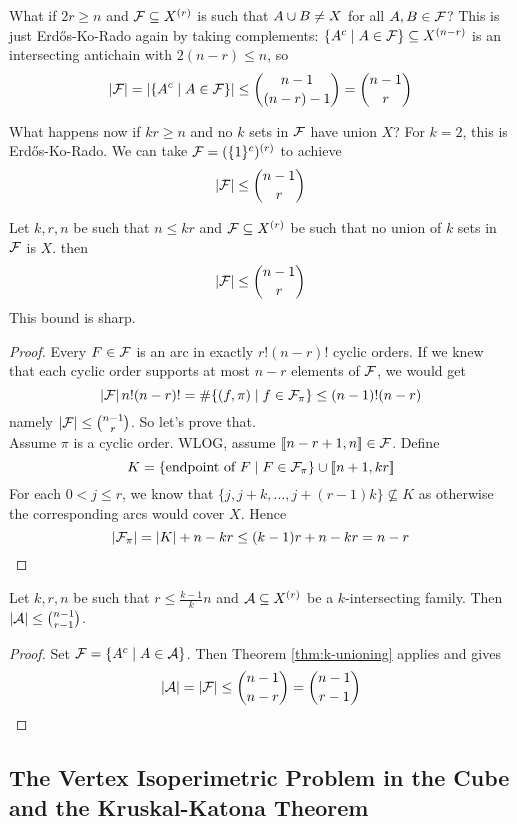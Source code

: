 \documentclass{article}
\begin{document}
\newlec

What if $2r \ge n$ and $\mathcal F \subseteq X^{(r)}$ is such that $A \cup B \ne X$ for all $A, B \in \mathcal F$? This is just Erd\H os-Ko-Rado again by taking complements: $\{A^c \mid A \in \mathcal F\} \subseteq X^{(n - r)}$ is an intersecting antichain with $2(n - r) \le n$, so
$$\left\lvert \mathcal F\right\rvert = \left\lvert \{A^c \mid A \in \mathcal F\}\right\rvert \le \binom{n - 1}{(n - r) - 1} = \binom{n - 1}r$$

What happens now if $kr \ge n$ and no $k$ sets in $\mathcal F$ have union $X$? For $k = 2$, this is Erd\H os-Ko-Rado. We can take $\mathcal F = (\{1\}^c)^{(r)}$ to achieve
$$\left\lvert \mathcal F\right\rvert \le \binom{n - 1}r$$

\begin{nthm}[Frankl]\label{thm:k-unioning}
  Let $k, r, n$ be such that $n \le kr$ and $\mathcal F \subseteq X^{(r)}$ be such that no union of $k$ sets in $\mathcal F$ is $X$. then
  $$\left\lvert \mathcal F\right\rvert \le \binom{n - 1}r$$
  This bound is sharp.
\end{nthm}
\begin{proof}
  Every $F \in \mathcal F$ is an arc in exactly $r!(n - r)!$ cyclic orders. If we knew that each cyclic order supports at most $n - r$ elements of $\mathcal F$, we would get
  $$\left\lvert \mathcal F\right\rvert n!(n - r)! = \#\{(f, \pi) \mid f \in \mathcal F_\pi\} \le (n - 1)!(n - r)$$
  namely $\left\lvert \mathcal F\right\rvert \le \binom{n - 1}r$. So let's prove that. \\
  Assume $\pi$ is a cyclic order. WLOG, assume $[\![n - r + 1, n]\!] \in \mathcal F$. Define
  $$K = \{\text{endpoint of } F \mid F \in \mathcal F_\pi\} \cup [\![n + 1, kr]\!]$$
  For each $0 < j \le r$, we know that $\{j, j + k, \dots, j + (r - 1)k\} \not\subseteq K$ as otherwise the corresponding arcs would cover $X$. Hence
  $$\left\lvert \mathcal F_\pi\right\rvert = \left\lvert K\right\rvert + n - kr \le (k - 1)r + n - kr = n - r$$
\end{proof}

\begin{ncor}
  Let $k, r, n$ be such that $r \le \frac{k - 1}k n$ and $\mathcal A \subseteq X^{(r)}$ be a $k$-intersecting family. Then $\left\lvert \mathcal A\right\rvert \le \binom{n - 1}{r - 1}$.
\end{ncor}
\begin{proof}
  Set $\mathcal F = \{A^c \mid A \in \mathcal A\}$. Then Theorem \ref{thm:k-unioning} applies and gives
  $$\left\lvert \mathcal A\right\rvert = \left\lvert \mathcal F\right\rvert \le \binom{n - 1}{n - r} = \binom{n - 1}{r - 1}$$
\end{proof}

\clearpage

\subsection{The Vertex Isoperimetric Problem in the Cube and the Kruskal-Katona Theorem}
\end{document}
